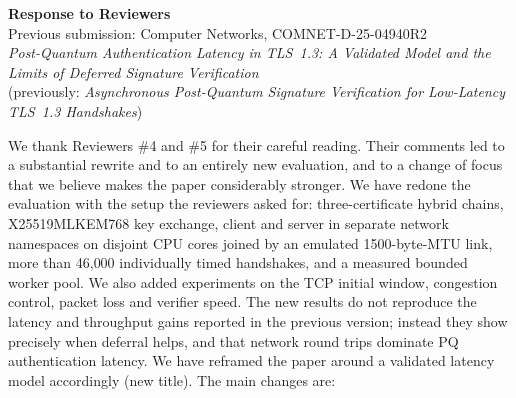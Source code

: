 \documentclass[11pt]{article}
\begin{document}
\begin{center}
{\Large\bfseries Response to Reviewers}\\[4pt]
Previous submission: Computer Networks, COMNET-D-25-04940R2\\[2pt]
\textit{Post-Quantum Authentication Latency in TLS~1.3: A Validated Model
and the Limits of Deferred Signature Verification}\\[2pt]
(previously: \textit{Asynchronous Post-Quantum Signature Verification for
Low-Latency TLS~1.3 Handshakes})
\end{center}

We thank Reviewers \#4 and \#5 for their careful reading.  Their comments
led to a substantial rewrite and to an entirely new evaluation, and to a
change of focus that we believe makes the paper considerably stronger.
We have redone the evaluation with the setup the reviewers asked for:
three-certificate hybrid chains, X25519MLKEM768 key exchange, client and
server in separate network namespaces on disjoint CPU cores joined by an
emulated 1500-byte-MTU link, more than 46{,}000 individually timed
handshakes, and a measured bounded worker pool.  We also added experiments
on the TCP initial window, congestion control, packet loss and verifier
speed.  The new results do not reproduce the latency and throughput gains
reported in the previous version; instead they show precisely when deferral
helps, and that network round trips dominate PQ authentication latency.
We have reframed the paper around a validated latency model accordingly
(new title).  The main changes are:
\end{document}
